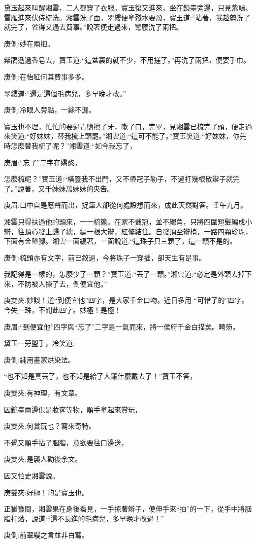 \begin{parag}
    黛玉起來叫醒湘雲，二人都穿了衣服。寶玉復又進來，坐在鏡臺旁邊，只見紫鵑、雪雁進來伏侍梳洗。湘雲洗了面，翠縷便拿殘水要潑，寶玉道:“站著，我趁勢洗了就完了，省得又過去費事。”說著便走過來，彎腰洗了兩把。\begin{note}庚側:妙在兩把。\end{note}紫鵑遞過香皂去，寶玉道:“這盆裏的就不少，不用搓了。”再洗了兩把，便要手巾。\begin{note}庚側:在怡紅何其費事多多。\end{note}翠縷道:“還是這個毛病兒，多早晚才改。”\begin{note}庚側:冷眼人旁點，一絲不漏。\end{note}寶玉也不理，忙忙的要過青鹽擦了牙，嗽了口，完畢，見湘雲已梳完了頭，便走過來笑道:“好妹妹，替我梳上頭罷。”湘雲道:“這可不能了。”寶玉笑道:“好妹妹，你先時怎麼替我梳了呢？”湘雲道:“如今我忘了，\begin{note}庚眉:“忘了”二字在嬌憨。\end{note}怎麼梳呢？”寶玉道:“橫豎我不出門，又不帶冠子勒子，不過打幾根散辮子就完了。”說著，又千妹妹萬妹妹的央告。\begin{note}庚眉:口中自是應聲而出，捉筆人卻從何處設想而來，成此天然對答。壬午九月。\end{note}湘雲只得扶過他的頭來，一一梳篦。在家不戴冠，並不總角，只將四圍短髮編成小辮，往頂心發上歸了總，編一根大辮，紅絛結住。自發頂至辮梢，一路四顆珍珠，下面有金墜腳。湘雲一面編著，一面說道:“這珠子只三顆了，這一顆不是的。\begin{note}庚側:梳頭亦有文字，前已敘過，今將珠子一穿插，卻天生有是事。\end{note}我記得是一樣的，怎麼少了一顆？”寶玉道:“丟了一顆。”湘雲道:“必定是外頭去掉下來，不防被人揀了去，倒便宜他。”\begin{note}庚雙夾:妙談！道“到便宜他”四字，是大家千金口吻。近日多用 “可惜了的”四字。今失一珠，不聞此四字。妙極！是極！\end{note}\begin{note}庚眉:“到便宜他”四字與“忘了”二字是一氣而來，將一侯府千金白描矣。畸笏。\end{note}黛玉一旁盥手，冷笑道:\begin{note}庚側:純用畫家烘染法。\end{note}“也不知是真丟了，也不知是給了人鑲什麼戴去了！”寶玉不答，\begin{note}庚雙夾:有神理，有文章。\end{note}因鏡臺兩邊俱是妝奩等物，順手拿起來賞玩，\begin{note}庚雙夾:何賞玩也？寫來奇特。\end{note}不覺又順手拈了胭脂，意欲要往口邊送，\begin{note}庚雙夾:是襲人勸後余文。\end{note}因又怕史湘雲說。\begin{note}庚雙夾:好極！的是寶玉也。\end{note}正猶豫間，湘雲果在身後看見，一手掠著辮子，便伸手來“拍”的一下，從手中將胭脂打落，說道:“這不長進的毛病兒，多早晚才改過！”\begin{note}庚側:前翠縷之言並非白寫。\end{note}
\end{parag}


